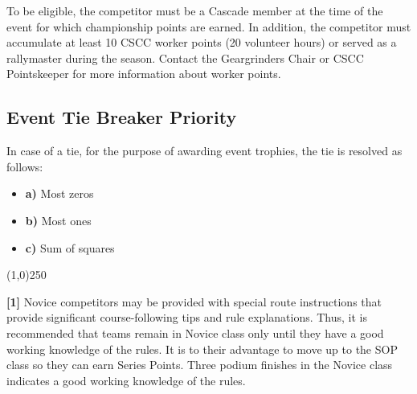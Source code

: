 To be eligible, the competitor must be a Cascade member at the time of the event for which championship points are earned. In addition, the competitor must accumulate at least 10 CSCC worker points (20 volunteer hours) or served as a rallymaster during the season. Contact the Geargrinders Chair or CSCC Pointskeeper for more information about worker points.

\subsection{Event Tie Breaker Priority}
In case of a tie, for the purpose of awarding event trophies, the tie is resolved as follows:
\begin{itemize}
\item \textbf{a)} Most zeros
\item \textbf{b)} Most ones
\item \textbf{c)} Sum of squares
\end{itemize}

\begin{center}
\line(1,0){250}
\end{center}
\textbf{[1]} Novice competitors may be provided with special route instructions that provide significant course-following tips and rule explanations. Thus, it is recommended that teams remain in Novice class only until they have a good working knowledge of the rules. It is to their advantage to move up to the SOP class so they can earn Series Points. Three podium finishes in the Novice class indicates a good working knowledge of the rules.